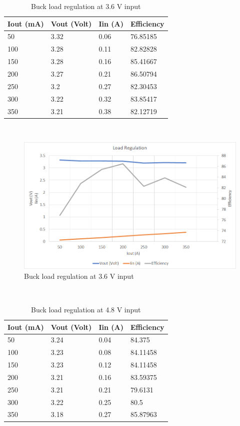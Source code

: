 \begin{table}[H]
\centering
\begin{tabular}{|l|l|l|l|}
\hline
Iout (mA) & Vout (Volt) & Iin (A) & Efficiency \\ \hline
50        & 3.32        & 0.06    & 76.85185   \\ \hline
100       & 3.28        & 0.11    & 82.82828   \\ \hline
150       & 3.28        & 0.16    & 85.41667   \\ \hline
200       & 3.27        & 0.21    & 86.50794   \\ \hline
250       & 3.2         & 0.27    & 82.30453   \\ \hline
300       & 3.22        & 0.32    & 83.85417   \\ \hline
350       & 3.21        & 0.38    & 82.12719   \\ \hline
\end{tabular}
\caption{Buck load regulation at 3.6 V input}
\label{table:4}
\end{table}
\\
\begin{figure}[H]
	\centering
	\includegraphics[width=\columnwidth]{IMGS/Buck load regulation at 3.6V input.png}
	\caption{ Buck load regulation at 3.6 V input}
	\label{fig:arch}
\end{figure}
\\
\begin{table}[H]
\centering
\begin{tabular}{|l|l|l|l|}
\hline
Iout (mA) & Vout (Volt) & Iin (A) & Efficiency \\ \hline
50        & 3.24        & 0.04    & 84.375     \\ \hline
100       & 3.23        & 0.08    & 84.11458   \\ \hline
150       & 3.23        & 0.12    & 84.11458   \\ \hline
200       & 3.21        & 0.16    & 83.59375   \\ \hline
250       & 3.21        & 0.21    & 79.6131    \\ \hline
300       & 3.22        & 0.25    & 80.5       \\ \hline
350       & 3.18        & 0.27    & 85.87963   \\ \hline
\end{tabular}
\caption{Buck load regulation at 4.8 V input}
\label{table:4}
\end{table}
